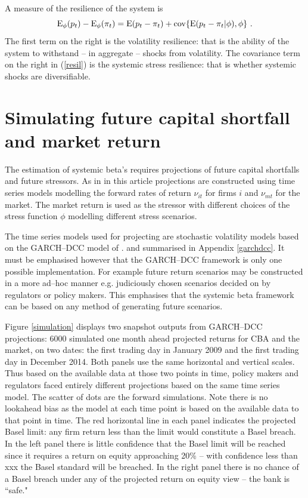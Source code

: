 \documentclass[authoryear]{elsarticle}
\newcommand{\E}{\mathrm{E}}
\newcommand{\cov}{\mathrm{cov}}
\newcommand{\eref}[1]{(\ref{#1})}
\newcommand{\fref}[1]{Figure \ref{#1}}
\newcommand{\aref}[1]{Appendix \ref{#1}}
\newcommand{\be}[1]{\begin{equation}\label{#1}}
\newcommand{\ee}{\end{equation}}
\begin{document}
A measure of the resilience of the system is
\be{resil}
\Es(p_t) - \Es(\pi_t) = \E(p_t-\pi_t) + \cov\{\E(p_t-\pi_t|\phi),\phi\}\ .
\ee
The first term on the right is the volatility resilience: that is the ability of the system to withstand -- in aggregate -- shocks from volatility.    The covariance term on the right in \eref{resil} is the systemic stress resilience:   that is whether systemic shocks are diversifiable. 






\section{Simulating future capital shortfall and market return}

The estimation of systemic beta's requires  projections of future capital shortfalls and future stressors.   As in \cite{brownlees2015} in this article projections are constructed  using time series models modelling the forward rates of return $\nu_{it}$ for firms $i$ and $\nu_{mt}$ for the market.   The market return is used as the stressor with different choices of the stress function $\phi$ modelling different stress scenarios.

The time series models used for projecting are stochastic volatility models based on the GARCH--DCC model of \cite{engle2002dynamic}.   and summarised in \aref{garchdcc}.    It must be emphasised however that the GARCH--DCC framework is only one possible implementation.   For example future return scenarios may be constructed in a more ad--hoc manner e.g. judiciously chosen scenarios decided on by regulators or policy makers.   This emphasises that the  systemic beta framework can be based on  any  method of generating  future  scenarios.

 \fref{simulation}   displays two snapshot outputs from GARCH--DCC projections:  6000  simulated one month ahead projected returns for  CBA and the market, on  two dates: the first trading day in January 2009 and the first trading day in December 2014.    Both panels use the same horizontal and vertical scales.   Thus based on the available data at those two points in  time, policy makers and regulators faced entirely different projections based on the same time series model.   The scatter of dots are the forward simulations.  Note there is no lookahead bias as the model at each time point is based on the available data to that point in time.    The red horizontal line in each panel indicates the projected Basel limit:  any firm return less than the limit would constitute a Basel breach.   In the left panel there is little confidence that the Basel limit will be reached since it requires a return on equity approaching 20\% -- with confidence less than xxx the Basel standard will be breached.  In the right panel there is no chance of a Basel breach under any of the projected return on equity view -- the bank is ``safe."  
 
\end{document}
